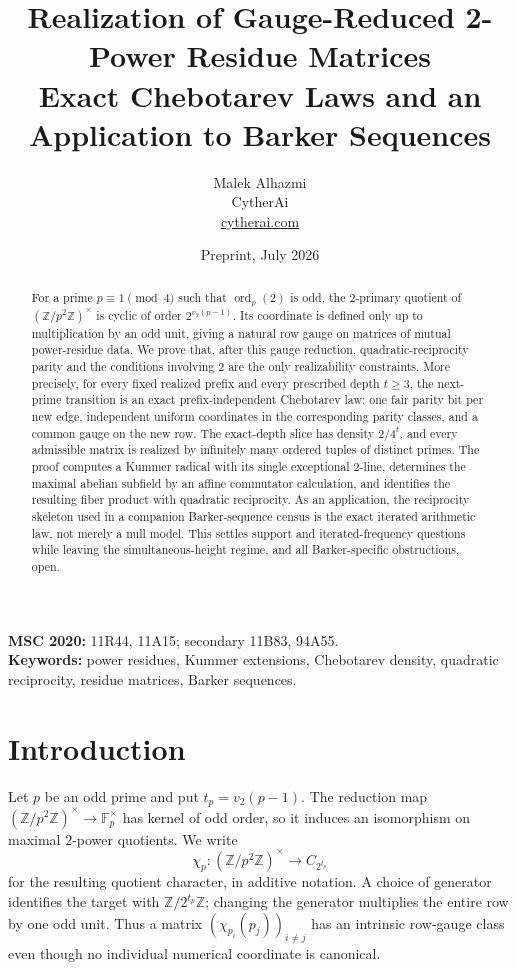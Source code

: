 \documentclass[11pt]{article}
\title{Realization of Gauge-Reduced 2-Power Residue Matrices\\
\large Exact Chebotarev Laws and an Application to Barker Sequences}
\author{Malek Alhazmi\\CytherAi\\\href{https://cytherai.com}{cytherai.com}}
\date{Preprint, July 2026}
\theoremstyle{definition}
\theoremstyle{remark}
\newcommand{\Z}{\mathbb Z}
\newcommand{\F}{\mathbb F}
\newcommand{\ord}{\operatorname{ord}}
\newcommand{\vtwo}{v_2}
\begin{document}
\maketitle

\begin{abstract}
For a prime $p\equiv1\pmod4$ such that $\ord_p(2)$ is odd, the
$2$-primary quotient of $(\Z/p^2\Z)^\times$ is cyclic of order
$2^{\vtwo(p-1)}$.  Its coordinate is defined only up to multiplication by
an odd unit, giving a natural row gauge on matrices of mutual power-residue
data.  We prove that, after this gauge reduction, quadratic-reciprocity
parity and the conditions involving $2$ are the only realizability
constraints.  More precisely, for every fixed realized prefix and every
prescribed depth $t\ge3$, the next-prime transition is an exact
prefix-independent Chebotarev law: one fair parity bit per new edge,
independent uniform coordinates in the corresponding parity classes, and a
common gauge on the new row.  The exact-depth slice has density
$2/4^t$, and every admissible matrix is realized by infinitely many ordered
tuples of distinct primes.  The proof computes a Kummer radical with its
single exceptional $2$-line, determines the maximal abelian subfield by an
affine commutator calculation, and identifies the resulting fiber product
with quadratic reciprocity.  As an application, the reciprocity skeleton
used in a companion Barker-sequence census is the exact iterated arithmetic
law, not merely a null model.  This settles support and iterated-frequency
questions while leaving the simultaneous-height regime, and all
Barker-specific obstructions, open.
\end{abstract}

\begin{center}
\small
\textbf{MSC 2020:} 11R44, 11A15; secondary 11B83, 94A55.\\
\textbf{Keywords:} power residues, Kummer extensions, Chebotarev density,
quadratic reciprocity, residue matrices, Barker sequences.
\end{center}

\section{Introduction}

Let $p$ be an odd prime and put $t_p=\vtwo(p-1)$.  The reduction map
$(\Z/p^2\Z)^\times\to\F_p^\times$ has kernel of odd order, so it induces an
isomorphism on maximal $2$-power quotients.  We write
\[
  \chi_p:(\Z/p^2\Z)^\times\longrightarrow C_{2^{t_p}}
\]
for the resulting quotient character, in additive notation.  A choice of
generator identifies the target with $\Z/2^{t_p}\Z$; changing the generator
multiplies the entire row by one odd unit.  Thus a matrix
$(\chi_{p_i}(p_j))_{i\ne j}$ has an intrinsic row-gauge class even though no
individual numerical coordinate is canonical.
\end{document}

